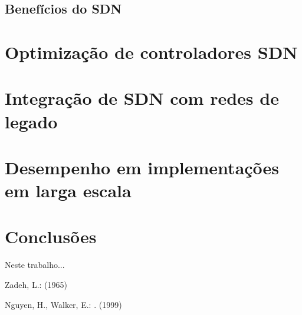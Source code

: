 \documentclass{llncs}
\begin{document}
\subsection{Benefícios do SDN}
\section{Optimização de controladores SDN}
\section{Integração de SDN com redes de legado}
\section{Desempenho em implementações em larga escala}







\section{Conclusões}
Neste trabalho...

%

\begin{thebibliography}{1}
Zadeh, L.:
 (1965)

Nguyen, H., Walker, E.:
.
 (1999)
\end{thebibliography}
\end{document}
